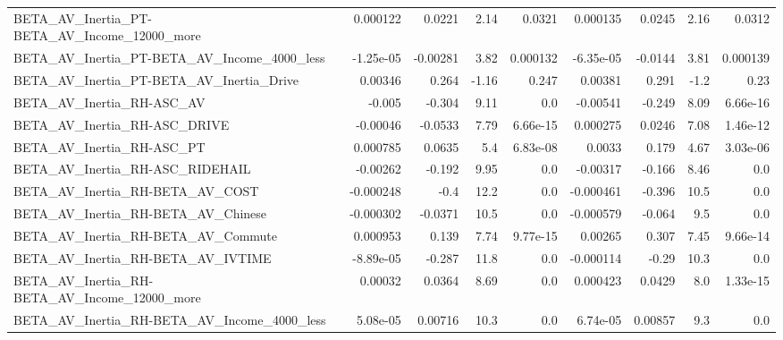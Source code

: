 \begin{tabular}{lrrrrrrrr}
BETA\_AV\_Inertia\_PT-BETA\_AV\_Income\_12000\_more       &    0.000122 &       0.0221 &     2.14 &   0.0321 &   0.000135 &      0.0245 &         2.16 &        0.0312 \\
BETA\_AV\_Inertia\_PT-BETA\_AV\_Income\_4000\_less        &   -1.25e-05 &     -0.00281 &     3.82 & 0.000132 &  -6.35e-05 &     -0.0144 &         3.81 &      0.000139 \\
BETA\_AV\_Inertia\_PT-BETA\_AV\_Inertia\_Drive           &     0.00346 &        0.264 &    -1.16 &    0.247 &    0.00381 &       0.291 &         -1.2 &          0.23 \\
BETA\_AV\_Inertia\_RH-ASC\_AV                          &      -0.005 &       -0.304 &     9.11 &      0.0 &   -0.00541 &      -0.249 &         8.09 &      6.66e-16 \\
BETA\_AV\_Inertia\_RH-ASC\_DRIVE                       &    -0.00046 &      -0.0533 &     7.79 & 6.66e-15 &   0.000275 &      0.0246 &         7.08 &      1.46e-12 \\
BETA\_AV\_Inertia\_RH-ASC\_PT                          &    0.000785 &       0.0635 &      5.4 & 6.83e-08 &     0.0033 &       0.179 &         4.67 &      3.03e-06 \\
BETA\_AV\_Inertia\_RH-ASC\_RIDEHAIL                    &    -0.00262 &       -0.192 &     9.95 &      0.0 &   -0.00317 &      -0.166 &         8.46 &           0.0 \\
BETA\_AV\_Inertia\_RH-BETA\_AV\_COST                    &   -0.000248 &         -0.4 &     12.2 &      0.0 &  -0.000461 &      -0.396 &         10.5 &           0.0 \\
BETA\_AV\_Inertia\_RH-BETA\_AV\_Chinese                 &   -0.000302 &      -0.0371 &     10.5 &      0.0 &  -0.000579 &      -0.064 &          9.5 &           0.0 \\
BETA\_AV\_Inertia\_RH-BETA\_AV\_Commute                 &    0.000953 &        0.139 &     7.74 & 9.77e-15 &    0.00265 &       0.307 &         7.45 &      9.66e-14 \\
BETA\_AV\_Inertia\_RH-BETA\_AV\_IVTIME                  &   -8.89e-05 &       -0.287 &     11.8 &      0.0 &  -0.000114 &       -0.29 &         10.3 &           0.0 \\
BETA\_AV\_Inertia\_RH-BETA\_AV\_Income\_12000\_more       &     0.00032 &       0.0364 &     8.69 &      0.0 &   0.000423 &      0.0429 &          8.0 &      1.33e-15 \\
BETA\_AV\_Inertia\_RH-BETA\_AV\_Income\_4000\_less        &    5.08e-05 &      0.00716 &     10.3 &      0.0 &   6.74e-05 &     0.00857 &          9.3 &           0.0 \\

\end{tabular}
